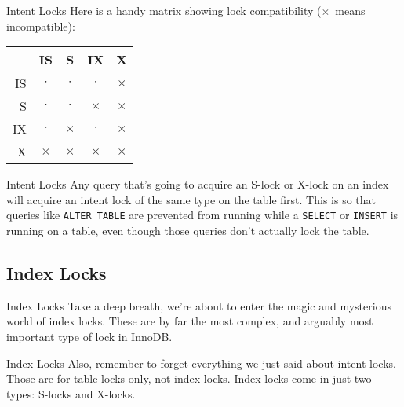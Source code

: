 \documentclass[14pt]{beamer}
\begin{document}
\begin{frame}{Intent Locks}
  Here is a handy matrix showing lock compatibility ($\times$~means
  incompatible):
  \begin{table}[ht]
    \begin{tabular}{r|c c c c}
        & IS       & S        & IX       & X        \\ \hline
     IS & $\cdot$  & $\cdot$  & $\cdot$  & $\times$ \\
     S  & $\cdot$  & $\cdot$  & $\times$ & $\times$ \\
     IX & $\cdot$  & $\times$ & $\cdot$  & $\times$ \\
     X  & $\times$ & $\times$ & $\times$ & $\times$ \\
    \end{tabular}
  \end{table}
\end{frame}

\begin{frame}{Intent Locks}
  Any query that's going to acquire an S-lock or X-lock on an index will acquire
  an intent lock of the same type on the table first.
  \newline
  \newline
  This is so that queries
  like \texttt{ALTER TABLE} are prevented from running while a \texttt{SELECT}
  or \texttt{INSERT} is running on a table, even though those queries don't
  actually lock the table.
\end{frame}

\subsection{Index Locks}

\begin{frame}{Index Locks}
  Take a deep breath, we're about to enter the magic and mysterious world of index locks.
  \newline
  \newline
  These are by far the most complex, and arguably most important type of lock in InnoDB.
\end{frame}

\begin{frame}{Index Locks}
  Also, remember to forget everything we just said about intent locks. Those are
  for table locks only, not index locks.
  \newline
  \newline
  Index locks come in just two types: S-locks and X-locks.
\end{frame}
\end{document}
